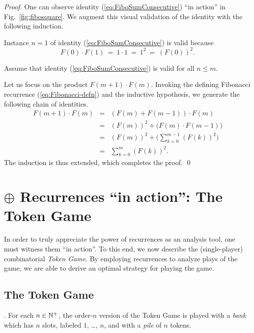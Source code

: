 \begin{proof}
One can observe identity (\ref{eq:FiboSumConsecutive}) ``in action''
in Fig.~\ref{fig:fibosquare}.  We augment this visual validation of
the identity with the following induction.

\medskip

Instance $n=1$ of identity (\ref{eq:FiboSumConsecutive}) is valid
because
\[ F(0) \cdot F(1) \ = \ 1 \cdot 1 \ = \ 1^2 \ = \ (F(0))^2. \]

\medskip

Assume that identity (\ref{eq:FiboSumConsecutive}) is valid for all $n
\leq m$.

\medskip

  Let us focus on the product
$F(m+1) \cdot F(m)$.  Invoking the defining Fibonacci recurrence
(\ref{eq:Fibonacci-defn}) and the inductive hypothesis, we generate
the following chain of identities.
\begin{eqnarray*}
F(m+1) \cdot F(m)
 & = &
   (F(m) + F(m-1)) \cdot F(m) \\
 & = &
   (F(m))^2 + \big( F(m) \cdot F(m-1) \big) \\
 & = & 
   (F(m))^2 + \big( \sum_{k=0}^{m-1} (F(k))^2 \big) \\
 & = &
   \sum_{k=0}^{m} (F(k))^2.
\end{eqnarray*}
The induction is thus extended, which completes the proof.
\qed
\end{proof}


\section{$\oplus$ Recurrences ``in action'': The Token Game}
\label{sec:TokenGame}

In order to truly appreciate the power of recurrences as an analysis
tool, one must witness them ``in action''.  To this end, we now
describe the (single-player) combinatorial {\it Token Game}.  By
employing recurrences to analyze plays of the game, we are able to
derive an optimal strategy for playing the game.

\subsection{The Token Game}
\label{sec:TokenGame-Rules}

.
For each $n \in \mathbb{N}^+$, the order-$n$ version of the Token Game is
played with a {\it bank} which has $n$ slots, labeled $1$, \ldots,
$n$, and with a {\it pile} of $n$ tokens.

